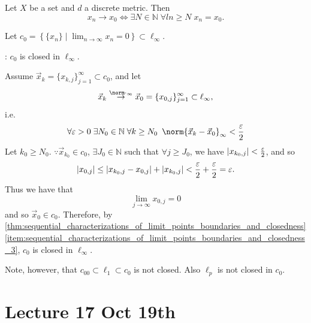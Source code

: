\documentclass[notoc,notitlepage]{tufte-book}
\begin{document}
\begin{eg}
  Let $X$ be a set and $d$ a discrete metric. Then
  \begin{equation*}
    x_n \to x_0 \iff \exists N \in \mathbb{N} \; \forall ln \geq N \; x_n = x_0.
  \end{equation*}
\end{eg}

\begin{eg}
  Let $c_0 = \left\{ \{ x_n \} \mid \lim_{n \to \infty} x_n = 0 \right\} \subset \ell_\infty$.

  \noindent{} : $c_0$ is closed in $\ell_\infty$.

  Assume $\vec{x}_k = \{ x_{k, j} \}_{j = 1}^{\infty} \subset c_0$, and let
  \begin{equation*}
    \vec{x}_k \overset{\norm\cdot_\infty}{\to} \vec{x}_0 = \{ x_{0, j} \}_{j = 1}^{\infty} \subset \ell_\infty,
  \end{equation*}
  i.e.
  \begin{equation*}
    \forall \epsilon > 0 \; \exists N_0 \in \mathbb{N} \; \forall k \geq N_0 \enspace \norm{ \vec{x}_k - \vec{x}_0 }_\infty < \frac{\epsilon}{2}
  \end{equation*}
  Let $k_0 \geq N_0$. $\because \vec{x}_{k_0} \in c_0$, $\exists J_0 \in \mathbb{N}$ such that $\forall j \geq J_0$, we have $\left| x_{k_0, j} \right| < \frac{\varepsilon}{2}$, and so
  \begin{equation*}
    \left|x_{0, j}\right| \leq \left| x_{k_0, j} - x_{0, j} \right| + \left| x_{k_0, j} \right| < \frac{\varepsilon}{2} + \frac{\varepsilon}{2} = \varepsilon.
  \end{equation*}
  Thus we have that
  \begin{equation*}
    \lim_{j \to \infty} x_{0, j} = 0
  \end{equation*}
  and so $\vec{x}_0 \in c_0$. Therefore, by \cref{thm:sequential_characterizations_of_limit_points_boundaries_and_closedness} \cref{item:sequential_characterizations_of_limit_points_boundaries_and_closedness_3}, $c_0$ is closed in $\ell_\infty$.
\end{eg}

Note, however, that $c_{00} \subset \ell_1 \subset c_0$ is not closed. Also $\ell_p$ is not closed in $c_0$.



\chapter{Lecture 17 Oct 19th}%
\label{chp:lecture_17_oct_19th}
\end{document}
